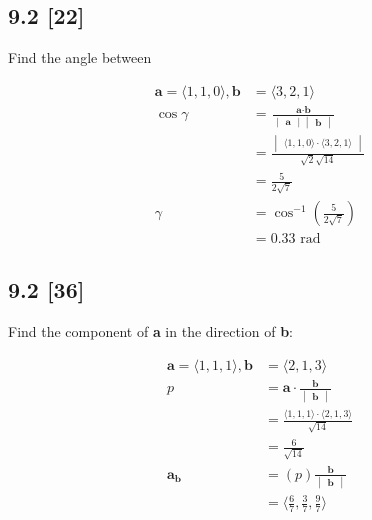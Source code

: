 \documentclass{article}
\begin{document}
\subsection*{9.2 [22]}
\setcounter{equation}{0}

Find the angle between

\begin{align}
    \textbf{a} = \langle1, 1, 0\rangle, \textbf{b} &= \langle3, 2, 1\rangle 
    \\
    \cos\gamma &= \frac{\textbf{a}\cdot\textbf{b}}{\begin{vmatrix}
    \textbf{a}
    \end{vmatrix}\begin{vmatrix}
    \textbf{b}
    \end{vmatrix}}
    \\
    &= \frac{\begin{vmatrix}
    \langle1, 1, 0\rangle \cdot\langle3, 2, 1\rangle
    \end{vmatrix}}{\sqrt{2}\sqrt{14}}
    \\
    &= \frac{5}{2\sqrt{7}}
    \\
    \gamma &= \cos^{-1}\left(\frac{5}{2\sqrt{7}}\right)
    \\
    &= 0.33 \text{ rad}
\end{align}

\subsection*{9.2 [36]}
\setcounter{equation}{0}

Find the component of \textbf{a} in the direction of \textbf{b}:

\begin{align}
    \textbf{a} = \langle1, 1, 1\rangle, \textbf{b} &= \langle2, 1, 3\rangle
    \\
    p &= \textbf{a} \cdot \frac{\textbf{b}}{\begin{vmatrix}
    \textbf{b}
    \end{vmatrix}}
    \\
    &= \frac{\langle1, 1, 1\rangle \cdot \langle2, 1, 3\rangle}{\sqrt{14}} 
    \\ 
    &= \frac{6}{\sqrt{14}}
    \\
    \textbf{a}_{\textbf{b}} &= (p)\frac{\textbf{b}}{\begin{vmatrix}
    \textbf{b}
    \end{vmatrix}}
    \\
    &= \langle\frac{6}{7}, \frac{3}{7}, \frac{9}{7}\rangle
\end{align}
\end{document}
